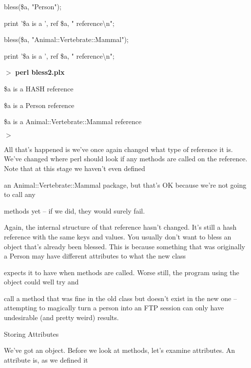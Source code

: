 \documentclass[a4paper,11pt]{book}
\begin{document}
\noindent 

\noindent bless(\$a, "Person");

\noindent print '\$a is a ', ref \$a, " reference\textbackslash n";

\noindent 

\noindent bless(\$a, "Animal::Vertebrate::Mammal");

\noindent print '\$a is a ', ref \$a, " reference\textbackslash n";

\noindent 

\noindent $>$ \textbf{perl bless2.plx}

\noindent \$a is a HASH reference

\noindent \$a is a Person reference

\noindent \$a is a Animal::Vertebrate::Mammal reference

\noindent $>$

\noindent 

\noindent All that's happened is we've once again changed what type of reference it is. We've changed where perl should look if any methods are called on the reference. Note that at this stage we haven't even defined

\noindent an Animal::Vertebrate::Mammal package, but that's OK because we're not going to call any

\noindent methods yet -- if we did, they would surely fail.

\noindent 

\noindent Again, the internal structure of that reference hasn't changed. It's still a hash reference with the same keys and values. You usually don't want to bless an object that's already been blessed. This is because something that was originally a Person may have different attributes to what the new class

\noindent expects it to have when methods are called. Worse still, the program using the object could well try and

\noindent call a method that was fine in the old class but doesn't exist in the new one -- attempting to magically turn a person into an FTP session can only have undesirable (and pretty weird) results.

\noindent 

\noindent Storing Attributes

\noindent 

\noindent We've got an object. Before we look at methods, let's examine attributes. An attribute is, as we defined it
\end{document}
